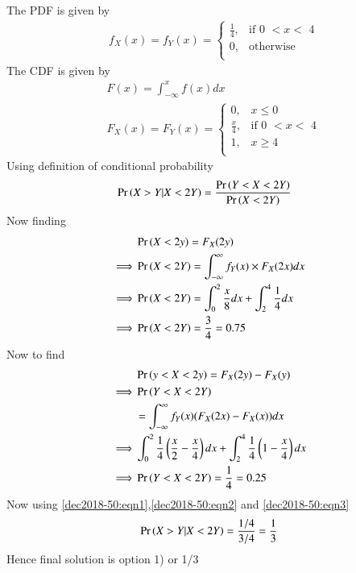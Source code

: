 
The PDF is given by
\begin{align}
   &f_X (x)=f_Y (x)=\nonumber \begin{cases}
         \frac{1}{4}, &\text{if 0 \(< x <\) 4}\\
         0, &\text{otherwise}\\
   \end{cases} 
\end{align}    
The CDF is given by
\begin{align}
   \nonumber& F(x)=\int_{-\infty}^{x} f(x)dx \\ \nonumber
   &F_X (x)=F_Y (x)=\nonumber \begin{cases}
          0, & x\leq 0\\
         \frac{x}{4}, &\text{if 0 \(< x <\) 4}\\
          1, &x\geq4\\
   \end{cases}    
\end{align}
Using definition of conditional probability 
\begin{align}
    &\Pr\left(X>Y|X<2Y\right)=\frac{\Pr\left(Y < X< 2Y\right)}{\Pr\left(X<2Y\right)} \label{dec2018-50:eqn1}
\end{align}
Now finding 
\begin{align}
    &\Pr\left(X<2y\right)=F_X (2y)\\
    \implies& \Pr\left(X<2Y\right)=\int_{-\infty}^{\infty} f_Y(x) \times F_X (2x)dx\\
    \implies& \Pr\left(X<2Y\right)=\int_{0}^{2} \frac{x}{8}dx +\int_{2}^{4}\frac{1}{4}dx\\
    \implies& \Pr\left(X<2Y\right)=\frac{3}{4}=0.75 \label{dec2018-50:eqn2}
\end{align}
Now to find 
\begin{align}
    &\Pr\left(y<X<2y\right)=F_X (2y)- F_X (y) \\
    \implies &\Pr\left(Y<X<2Y\right)\\ \nonumber 
    &=\int_{-\infty}^{\infty} f_Y (x)( F_X (2x)- F_X(x))dx \\
   \implies &\int_{0}^{2}\frac{1}{4}\left(\frac{x}{2}-\frac{x}{4}\right) dx +\int_{2}^{4}\frac{1}{4}\left(1-\frac{x}{4}\right) dx\\
   \implies &\Pr\left(Y<X<2Y\right)=\frac{1}{4}=0.25 \label{dec2018-50:eqn3}
\end{align}
Now using \eqref{dec2018-50:eqn1},\eqref{dec2018-50:eqn2} and \eqref{dec2018-50:eqn3}
\begin{align}
    \Pr\left(X>Y|X<2Y\right)=\frac{1/4}{3/4}=\frac{1}{3}
\end{align}
Hence final solution is option 1) or 1/3 
